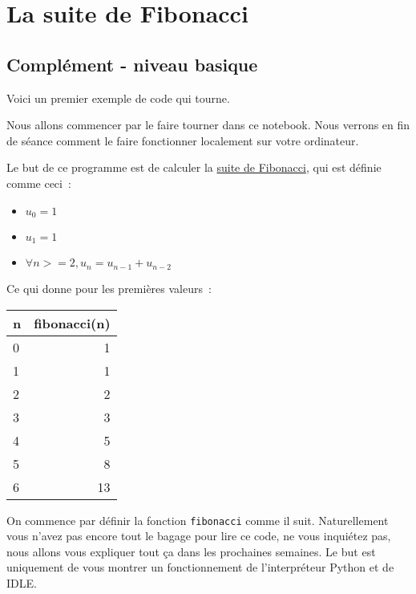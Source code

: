     \hypertarget{la-suite-de-fibonacci}{%
\section{La suite de Fibonacci}\label{la-suite-de-fibonacci}}

    \hypertarget{compluxe9ment---niveau-basique}{%
\subsection{Complément - niveau
basique}\label{compluxe9ment---niveau-basique}}

    Voici un premier exemple de code qui tourne.

Nous allons commencer par le faire tourner dans ce notebook. Nous
verrons en fin de séance comment le faire fonctionner localement sur
votre ordinateur.

    Le but de ce programme est de calculer la
\href{https://fr.wikipedia.org/wiki/Suite_de_Fibonacci}{suite de
Fibonacci}, qui est définie comme ceci~:

\begin{itemize}
\tightlist
\item
  \(u_0 = 1\)
\item
  \(u_1 = 1\)
\item
  \(\forall n >= 2, u_n = u_{n-1} + u_{n-2}\)
\end{itemize}

Ce qui donne pour les premières valeurs~:

    \begin{longtable}[]{@{}lr@{}}
\toprule
n & fibonacci(n)\tabularnewline
\midrule
\endhead
0 & 1\tabularnewline
1 & 1\tabularnewline
2 & 2\tabularnewline
3 & 3\tabularnewline
4 & 5\tabularnewline
5 & 8\tabularnewline
6 & 13\tabularnewline
\bottomrule
\end{longtable}

    On commence par définir la fonction \texttt{fibonacci} comme il suit.
Naturellement vous n'avez pas encore tout le bagage pour lire ce code,
ne vous inquiétez pas, nous allons vous expliquer tout ça dans les
prochaines semaines. Le but est uniquement de vous montrer un
fonctionnement de l'interpréteur Python et de IDLE.

